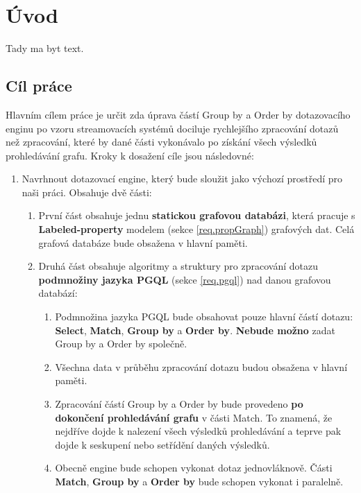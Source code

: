 \chapter*{Úvod}

Tady ma byt text.

\section*{Cíl práce}

Hlavním cílem práce je určit zda úprava částí Group by a Order by dotazovacího enginu po vzoru streamovacích systémů dociluje rychlejšího zpracování dotazů než zpracování, které by dané části vykonávalo po získání všech výsledků prohledávání grafu.
Kroky k dosažení cíle jsou následovné:
\begin{enumerate}
\item
Navrhnout dotazovací engine, který bude sloužit jako výchozí prostředí pro naši práci.
Obsahuje dvě části:
\begin{enumerate}
\item První část obsahuje jednu \textbf{statickou grafovou databázi}, která pracuje s \textbf{Labeled-property} modelem (sekce \ref{req.propGraph}) grafových dat.
Celá grafová databáze bude obsažena v hlavní paměti.

\item Druhá část obsahuje algoritmy a struktury pro zpracování dotazu \textbf{podmnožiny jazyka PGQL} (sekce \ref{req.pgql}) nad danou grafovou databází:
    \begin{enumerate}
    \item Podmnožina jazyka PGQL bude obsahovat pouze hlavní částí dotazu: \textbf{Select}, \textbf{Match}, \textbf{Group by} a \textbf{Order by}.
    \textbf{Nebude možno} zadat Group by a Order by společně.
    \item Všechna data v průběhu zpracování dotazu budou obsažena v hlavní paměti.
    \item Zpracování částí Group by a Order by bude provedeno \textbf{po dokončení prohledávání grafu} v části Match.
    To znamená, že nejdříve dojde k nalezení všech výsledků prohledávání a teprve pak dojde k seskupení nebo setřídění daných výsledků.
    \item Obecně engine bude schopen vykonat dotaz jednovláknově.
    Části \textbf{Match}, \textbf{Group by} a \textbf{Order by} bude schopen vykonat i paralelně.
    \end{enumerate}
\end{enumerate}


\end{enumerate}
